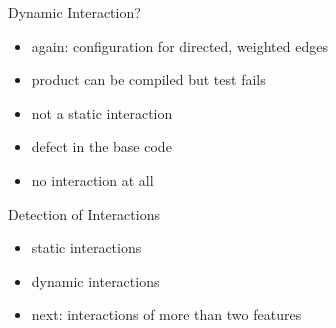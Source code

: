 \begin{frame}{\myframetitle}\setlength\leftmargini{3mm}
	\begin{mycolumns}[widths={70}]
	\mynextcolumn
		\begin{example}{Dynamic Interaction?}
			\begin{itemize}
				\item again: configuration for directed, weighted edges
				\item product can be compiled but test fails
				\item not a static interaction
				\item defect in the base code
				\item no interaction at all
			\end{itemize}
		\end{example}
		\begin{note}{Detection of Interactions}
			\begin{itemize}
				\item static interactions\\\mysource{\lectureanalyses}
				\item dynamic interactions\\\mysource{\lecturetesting}
				\item next: interactions of more than two features
			\end{itemize}
		\end{note}
	\end{mycolumns}
\end{frame}


